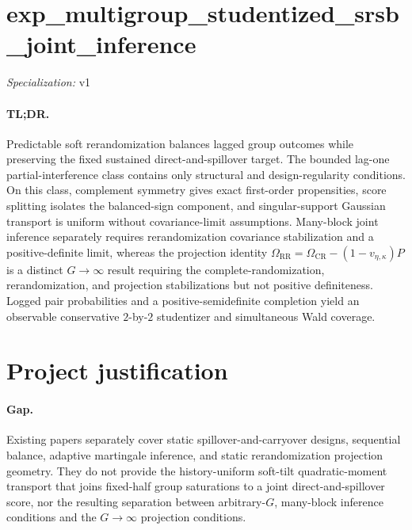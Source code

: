 \documentclass{article}
\begin{document}
\sloppy

\section*{exp\_\allowbreak{}multigroup\_\allowbreak{}studentized\_\allowbreak{}srsb\_\allowbreak{}joint\_\allowbreak{}inference}

\noindent\textit{Specialization:} v1\par

\paragraph{TL;DR.} Predictable soft rerandomization balances lagged group outcomes while preserving the fixed sustained direct-and-spillover target.  The bounded lag-one partial-interference class contains only structural and design-regularity conditions.  On this class, complement symmetry gives exact first-order propensities, score splitting isolates the balanced-sign component, and singular-support Gaussian transport is uniform without covariance-limit assumptions.  Many-block joint inference separately requires rerandomization covariance stabilization and a positive-definite limit, whereas the projection identity \(\Omega_{\mathrm{RR}}=\Omega_{\mathrm{CR}}-(1-v_{\eta,\kappa})P\) is a distinct \(G\to\infty\) result requiring the complete-randomization, rerandomization, and projection stabilizations but not positive definiteness.  Logged pair probabilities and a positive-semidefinite completion yield an observable conservative \(2\)-by-\(2\) studentizer and simultaneous Wald coverage.

\section{Project justification}

\paragraph{Gap.} Existing papers separately cover static spillover-and-carryover designs, sequential balance, adaptive martingale inference, and static rerandomization projection geometry.  They do not provide the history-uniform soft-tilt quadratic-moment transport that joins fixed-half group saturations to a joint direct-and-spillover score, nor the resulting separation between arbitrary-\(G\), many-block inference conditions and the \(G\to\infty\) projection conditions.
\end{document}
